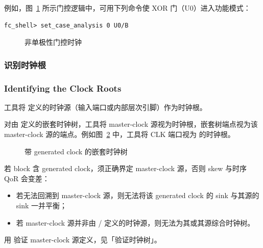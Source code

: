 例如，图~\ref{fig:cts-non-unate} 所示门控逻辑中，可用下列命令使 XOR 门（U0）进入功能模式：
\begin{lstlisting}
fc_shell> set_case_analysis 0 U0/B
\end{lstlisting}

\begin{figure}[htbp]
\centering
{}
\caption{非单极性门控时钟}
\label{fig:cts-non-unate}
\end{figure}

\subsubsection{识别时钟根}
\subsubsection*{Identifying the Clock Roots}

工具将  定义的时钟源（输入端口或内部层次引脚）作为时钟根。

对由  定义的嵌套时钟树，工具将 master-clock 源视为时钟根，嵌套树端点视为该 master-clock 源的端点。例如图~\ref{fig:cts-nested} 中，工具将 CLK 端口视为  的时钟根。

\begin{figure}[htbp]
\centering
{}
\caption{带 generated clock 的嵌套时钟树}
\label{fig:cts-nested}
\end{figure}

若 block 含 generated clock，须正确界定 master-clock 源，否则 skew 与时序 QoR 会变差：
\begin{itemize}
  \item 若无法回溯到 master-clock 源，则无法将该 generated clock 的 sink 与其源的 sink 一并平衡；
  \item 若 master-clock 源并非由 / 定义的时钟源，则无法为其或其源综合时钟树。
\end{itemize}
用  验证 master-clock 源定义，见「验证时钟树」。

